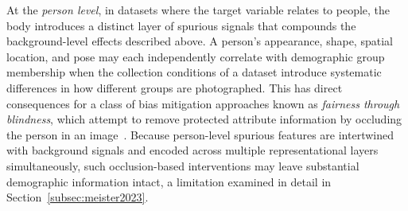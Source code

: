 
At the \emph{person level}, in datasets where the target variable relates to people, the
body introduces a distinct layer of spurious signals that compounds the background-level
effects described above. A person's appearance, shape, spatial location, and pose may each
independently correlate with demographic group membership when the collection conditions of
a dataset introduce systematic differences in how different groups are photographed. This
has direct consequences for a class of bias mitigation approaches known as
\emph{fairness through blindness}, which attempt to remove protected attribute information
by occluding the person in an
image~\cite{Burns_2018_WomenAlsoSnowboard, Wang_2019_BalancedDatasetsNotEnough}.
Because person-level spurious features are intertwined with background signals and encoded
across multiple representational layers simultaneously, such occlusion-based interventions
may leave substantial demographic information intact, a limitation examined in detail in
Section~\ref{subsec:meister2023}.


